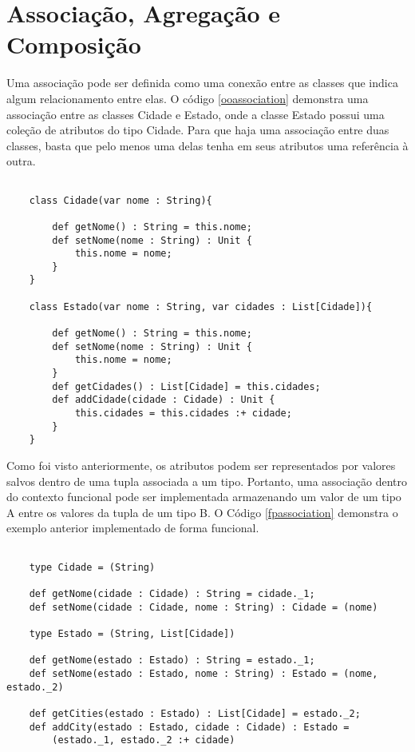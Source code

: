 \section{Associação, Agregação e Composição}

Uma associação pode ser definida como uma 
conexão entre as classes que indica algum 
relacionamento entre elas\cite{Sommerville10}. 
O código \ref{ooassociation} demonstra uma 
associação entre as classes Cidade e Estado, onde 
a classe Estado possui uma coleção de atributos 
do tipo Cidade. Para que haja uma associação 
entre duas classes, basta que pelo menos 
uma delas tenha em seus atributos uma 
referência à outra.

\begin{lstlisting}[caption={Exemplo de associação entre classes.},label=ooassociation]
    
    class Cidade(var nome : String){

        def getNome() : String = this.nome;
        def setNome(nome : String) : Unit {
            this.nome = nome;
        }
    }

    class Estado(var nome : String, var cidades : List[Cidade]){

        def getNome() : String = this.nome;
        def setNome(nome : String) : Unit {
            this.nome = nome;
        }
        def getCidades() : List[Cidade] = this.cidades;
        def addCidade(cidade : Cidade) : Unit {
            this.cidades = this.cidades :+ cidade;
        }
    }

\end{lstlisting}

Como foi visto anteriormente, os atributos 
podem ser representados por valores salvos 
dentro de uma tupla associada a um tipo. 
Portanto, uma associação dentro do contexto 
funcional pode ser implementada armazenando 
um valor de um tipo A entre os valores da tupla 
de um tipo B. O Código \ref{fpassociation} 
demonstra o exemplo anterior implementado 
de forma funcional.

\begin{lstlisting}[caption={Exemplo de associação no contexto funcional.},label=fpassociation]
    
    type Cidade = (String)
    
    def getNome(cidade : Cidade) : String = cidade._1;
    def setNome(cidade : Cidade, nome : String) : Cidade = (nome)

    type Estado = (String, List[Cidade])
    
    def getNome(estado : Estado) : String = estado._1;
    def setNome(estado : Estado, nome : String) : Estado = (nome, estado._2)
    
    def getCities(estado : Estado) : List[Cidade] = estado._2;
    def addCity(estado : Estado, cidade : Cidade) : Estado =
        (estado._1, estado._2 :+ cidade)

\end{lstlisting}


